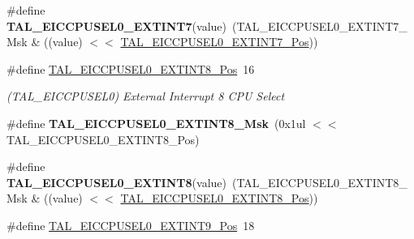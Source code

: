 \begin{DoxyCompactItemize}
\item 
\hypertarget{group___s_a_m_l21___t_a_l_gae451c801ffc0e107f5629359862910ba}{}\#define {\bfseries T\+A\+L\+\_\+\+E\+I\+C\+C\+P\+U\+S\+E\+L0\+\_\+\+E\+X\+T\+I\+N\+T7}(value)~(T\+A\+L\+\_\+\+E\+I\+C\+C\+P\+U\+S\+E\+L0\+\_\+\+E\+X\+T\+I\+N\+T7\+\_\+\+Msk \& ((value) $<$$<$ \hyperlink{group___s_a_m_l21___t_a_l_gac73545373f2e6ca9a1dcb474fb4a9bad}{T\+A\+L\+\_\+\+E\+I\+C\+C\+P\+U\+S\+E\+L0\+\_\+\+E\+X\+T\+I\+N\+T7\+\_\+\+Pos}))\label{group___s_a_m_l21___t_a_l_gae451c801ffc0e107f5629359862910ba}

\item 
\hypertarget{group___s_a_m_l21___t_a_l_ga72c6cb3b610f550f127422eb2b395cba}{}\#define \hyperlink{group___s_a_m_l21___t_a_l_ga72c6cb3b610f550f127422eb2b395cba}{T\+A\+L\+\_\+\+E\+I\+C\+C\+P\+U\+S\+E\+L0\+\_\+\+E\+X\+T\+I\+N\+T8\+\_\+\+Pos}~16\label{group___s_a_m_l21___t_a_l_ga72c6cb3b610f550f127422eb2b395cba}

\begin{DoxyCompactList}\small\item\em (T\+A\+L\+\_\+\+E\+I\+C\+C\+P\+U\+S\+E\+L0) External Interrupt 8 C\+P\+U Select \end{DoxyCompactList}\item 
\hypertarget{group___s_a_m_l21___t_a_l_ga97d8b09f3a45e1e9fa647eb8014c7354}{}\#define {\bfseries T\+A\+L\+\_\+\+E\+I\+C\+C\+P\+U\+S\+E\+L0\+\_\+\+E\+X\+T\+I\+N\+T8\+\_\+\+Msk}~(0x1ul $<$$<$ T\+A\+L\+\_\+\+E\+I\+C\+C\+P\+U\+S\+E\+L0\+\_\+\+E\+X\+T\+I\+N\+T8\+\_\+\+Pos)\label{group___s_a_m_l21___t_a_l_ga97d8b09f3a45e1e9fa647eb8014c7354}

\item 
\hypertarget{group___s_a_m_l21___t_a_l_gad64d18d9982c3bcb769f0a6eba8444b5}{}\#define {\bfseries T\+A\+L\+\_\+\+E\+I\+C\+C\+P\+U\+S\+E\+L0\+\_\+\+E\+X\+T\+I\+N\+T8}(value)~(T\+A\+L\+\_\+\+E\+I\+C\+C\+P\+U\+S\+E\+L0\+\_\+\+E\+X\+T\+I\+N\+T8\+\_\+\+Msk \& ((value) $<$$<$ \hyperlink{group___s_a_m_l21___t_a_l_ga72c6cb3b610f550f127422eb2b395cba}{T\+A\+L\+\_\+\+E\+I\+C\+C\+P\+U\+S\+E\+L0\+\_\+\+E\+X\+T\+I\+N\+T8\+\_\+\+Pos}))\label{group___s_a_m_l21___t_a_l_gad64d18d9982c3bcb769f0a6eba8444b5}

\item 
\hypertarget{group___s_a_m_l21___t_a_l_ga8175f7e92ab4db1d9d18337d2c7877d4}{}\#define \hyperlink{group___s_a_m_l21___t_a_l_ga8175f7e92ab4db1d9d18337d2c7877d4}{T\+A\+L\+\_\+\+E\+I\+C\+C\+P\+U\+S\+E\+L0\+\_\+\+E\+X\+T\+I\+N\+T9\+\_\+\+Pos}~18\label{group___s_a_m_l21___t_a_l_ga8175f7e92ab4db1d9d18337d2c7877d4}


\end{DoxyCompactItemize}
